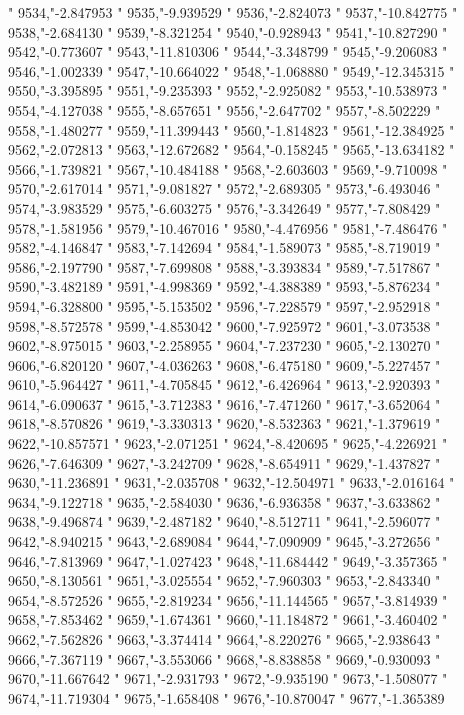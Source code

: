 "
9534,"-2.847953
"
9535,"-9.939529
"
9536,"-2.824073
"
9537,"-10.842775
"
9538,"-2.684130
"
9539,"-8.321254
"
9540,"-0.928943
"
9541,"-10.827290
"
9542,"-0.773607
"
9543,"-11.810306
"
9544,"-3.348799
"
9545,"-9.206083
"
9546,"-1.002339
"
9547,"-10.664022
"
9548,"-1.068880
"
9549,"-12.345315
"
9550,"-3.395895
"
9551,"-9.235393
"
9552,"-2.925082
"
9553,"-10.538973
"
9554,"-4.127038
"
9555,"-8.657651
"
9556,"-2.647702
"
9557,"-8.502229
"
9558,"-1.480277
"
9559,"-11.399443
"
9560,"-1.814823
"
9561,"-12.384925
"
9562,"-2.072813
"
9563,"-12.672682
"
9564,"-0.158245
"
9565,"-13.634182
"
9566,"-1.739821
"
9567,"-10.484188
"
9568,"-2.603603
"
9569,"-9.710098
"
9570,"-2.617014
"
9571,"-9.081827
"
9572,"-2.689305
"
9573,"-6.493046
"
9574,"-3.983529
"
9575,"-6.603275
"
9576,"-3.342649
"
9577,"-7.808429
"
9578,"-1.581956
"
9579,"-10.467016
"
9580,"-4.476956
"
9581,"-7.486476
"
9582,"-4.146847
"
9583,"-7.142694
"
9584,"-1.589073
"
9585,"-8.719019
"
9586,"-2.197790
"
9587,"-7.699808
"
9588,"-3.393834
"
9589,"-7.517867
"
9590,"-3.482189
"
9591,"-4.998369
"
9592,"-4.388389
"
9593,"-5.876234
"
9594,"-6.328800
"
9595,"-5.153502
"
9596,"-7.228579
"
9597,"-2.952918
"
9598,"-8.572578
"
9599,"-4.853042
"
9600,"-7.925972
"
9601,"-3.073538
"
9602,"-8.975015
"
9603,"-2.258955
"
9604,"-7.237230
"
9605,"-2.130270
"
9606,"-6.820120
"
9607,"-4.036263
"
9608,"-6.475180
"
9609,"-5.227457
"
9610,"-5.964427
"
9611,"-4.705845
"
9612,"-6.426964
"
9613,"-2.920393
"
9614,"-6.090637
"
9615,"-3.712383
"
9616,"-7.471260
"
9617,"-3.652064
"
9618,"-8.570826
"
9619,"-3.330313
"
9620,"-8.532363
"
9621,"-1.379619
"
9622,"-10.857571
"
9623,"-2.071251
"
9624,"-8.420695
"
9625,"-4.226921
"
9626,"-7.646309
"
9627,"-3.242709
"
9628,"-8.654911
"
9629,"-1.437827
"
9630,"-11.236891
"
9631,"-2.035708
"
9632,"-12.504971
"
9633,"-2.016164
"
9634,"-9.122718
"
9635,"-2.584030
"
9636,"-6.936358
"
9637,"-3.633862
"
9638,"-9.496874
"
9639,"-2.487182
"
9640,"-8.512711
"
9641,"-2.596077
"
9642,"-8.940215
"
9643,"-2.689084
"
9644,"-7.090909
"
9645,"-3.272656
"
9646,"-7.813969
"
9647,"-1.027423
"
9648,"-11.684442
"
9649,"-3.357365
"
9650,"-8.130561
"
9651,"-3.025554
"
9652,"-7.960303
"
9653,"-2.843340
"
9654,"-8.572526
"
9655,"-2.819234
"
9656,"-11.144565
"
9657,"-3.814939
"
9658,"-7.853462
"
9659,"-1.674361
"
9660,"-11.184872
"
9661,"-3.460402
"
9662,"-7.562826
"
9663,"-3.374414
"
9664,"-8.220276
"
9665,"-2.938643
"
9666,"-7.367119
"
9667,"-3.553066
"
9668,"-8.838858
"
9669,"-0.930093
"
9670,"-11.667642
"
9671,"-2.931793
"
9672,"-9.935190
"
9673,"-1.508077
"
9674,"-11.719304
"
9675,"-1.658408
"
9676,"-10.870047
"
9677,"-1.365389
